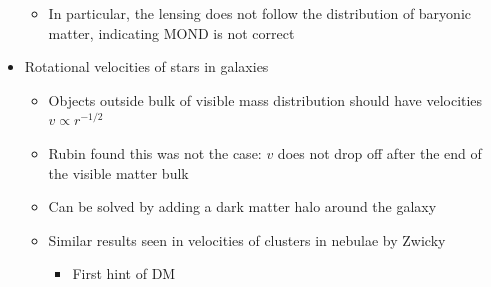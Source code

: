 \begin{itemize}
\begin{itemize}
    \item In particular, the lensing does not follow the distribution of baryonic matter, indicating MOND is not correct
  \end{itemize}
  \item Rotational velocities of stars in galaxies
  \begin{itemize}
    \item Objects outside bulk of visible mass distribution should have velocities $v\propto r^{-1/2}$
    \item Rubin found this was not the case: $v$ does not drop off after the end of the visible matter bulk
    \item Can be solved by adding a dark matter halo around the galaxy
    \item Similar results seen in velocities of clusters in nebulae by Zwicky
    \begin{itemize}
      \item First hint of DM
    \end{itemize}
  \end{itemize}
\end{itemize}

